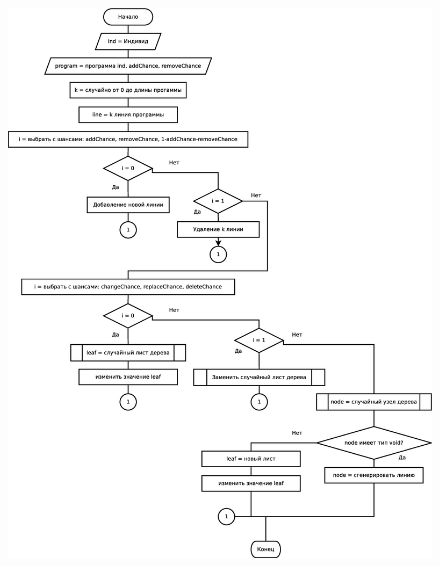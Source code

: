 \documentclass[russian,utf8,emptystyle]{eskdtext}
\begin{document}
\begin{spacing}{1.5}
\clearpage
\begin{figure}[h!]
\centering
\includegraphics[height=0.85\textheight]{mutation_alg.eps}
\end{figure}
\newpage


\end{spacing}
\end{document}
